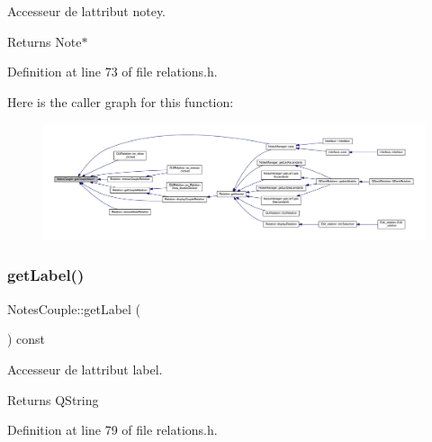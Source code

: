 Accesseur de l\textquotesingle{}attribut notey. 

\begin{DoxyReturn}{Returns}
Note$\ast$ 
\end{DoxyReturn}


Definition at line 73 of file relations.\+h.

Here is the caller graph for this function\+:\nopagebreak
\begin{figure}[H]
\begin{center}
\leavevmode
\includegraphics[width=350pt]{class_notes_couple_a88ed049d759024520c07f1412a6a7d0a_icgraph}
\end{center}
\end{figure}
\mbox{\label{class_notes_couple_a7ea47703a7ae6e11c46a2078bfc90924}} 
\subsubsection{\texorpdfstring{get\+Label()}{getLabel()}}
{\footnotesize\ttfamily Notes\+Couple\+::get\+Label (\begin{DoxyParamCaption}{ }\end{DoxyParamCaption}) const\hspace{0.3cm}{\ttfamily [inline]}}



Accesseur de l\textquotesingle{}attribut label. 

\begin{DoxyReturn}{Returns}
Q\+String 
\end{DoxyReturn}


Definition at line 79 of file relations.\+h.

